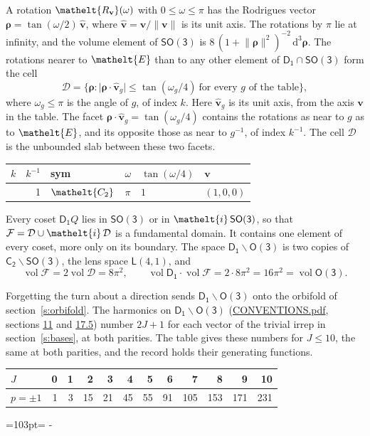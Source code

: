 \documentclass[10pt,a4paper]{article}
\newcommand{\needspace}[1]{\par\penalty-100\begingroup\dimen0=#1\relax\dimen2=\pagegoal
  \advance\dimen2-\pagetotal\ifdim\dimen0>\dimen2\relax\ifdim\dimen2>0pt\vfil\break\fi\fi
  \endgroup}
\numberwithin{equation}{section}
\newcommand{\eltfont}[1]{{\let\sigma\eltsigma\mathelt{#1}}}
\newcommand{\grp}[1]{\mathsf{#1}}
\newcommand{\cls}[1]{\eltfont{#1}}
\newcommand{\elt}[1]{\eltfont{#1}}
\newcommand{\dirvec}[3]{(#1, #2, #3)}
\newcommand{\unitaxis}{\hat{\mathbf{v}}}
\newcommand{\vv}{\mathbf{v}}
\newcommand{\diff}{\mathrm{d}}
\newcommand{\vol}{\operatorname{vol}}
\newcommand{\rodrigues}{\boldsymbol{\rho}}
\newcommand{\fcell}{\mathcal{D}}
\newcommand{\fdomain}{\mathcal{F}}
\newcommand{\lensspace}[2]{\mathsf{L}(#1, #2)}
\begin{document}
\leavevmode\label{n:vector.rodrigues}\label{n:vector.unitaxis}A rotation $\elt{R_{\vv}}(\omega)$ with $0 \le \omega \le \pi$ has the Rodrigues vector $\rodrigues = \tan(\omega/2)\,\unitaxis$, where $\unitaxis = \vv/\lVert\vv\rVert$ is its unit axis. The rotations by $\pi$ lie at infinity, and the volume element of \href{SO3.pdf}{$\grp{SO(3)}$} is $8\,(1 + \lVert\rodrigues\rVert^2)^{-2}\,\diff^3\rodrigues$.
\leavevmode\label{n:set.cell}The rotations nearer to $\elt{E}$ than to any other element of $\grp{D_{1}} \cap \grp{SO(3)}$ form the cell
\begin{equation}\label{e:cell}\fcell = \bigl\{\rodrigues : \lvert\rodrigues\cdot\unitaxis_g\rvert \le \tan(\omega_g/4)\ \text{for every $g$ of the table}\bigr\},\end{equation}
where $\omega_g \le \pi$ is the angle of $g$, of index $k$. Here $\unitaxis_g$ is its unit axis, from the axis $\vv$ in the table. The facet $\rodrigues\cdot\unitaxis_g = \tan(\omega_g/4)$ contains the rotations as near to $g$ as to $\elt{E}$, and its opposite those as near to $g^{-1}$, of index $k^{-1}$. The cell $\fcell$ is the unbounded slab between these two facets.
{\small\begin{longtable}{@{}rrllll@{}}\toprule
$k$ & $k^{-1}$ & sym & $\omega$ & $\tan(\omega/4)$ & $\vv$\\\midrule\endhead
\bottomrule\endfoot\endlastfoot
1 & 1 & $\cls{C_{2}}$ & $\pi$ & $1$ & $\dirvec{1}{0}{0}$\\
\bottomrule\end{longtable}}

\leavevmode\label{n:set.fundamental}Every coset $\grp{D_{1}}Q$ lies in \href{SO3.pdf}{$\grp{SO(3)}$} or in $\elt{i}\,\grp{SO(3)}$, so that $\fdomain = \fcell \cup \elt{i}\,\fcell$ is a fundamental domain. It contains one element of every coset, more only on its boundary.
\leavevmode\label{n:set.lens}The space $\grp{D_{1}}\backslash\grp{O(3)}$ is two copies of $\grp{C_{2}}\backslash\grp{SO(3)}$, the lens space $\lensspace{4}{1}$, and
\begin{equation}\label{e:volume}\vol\fdomain = 2\vol\fcell = 8\pi^2,\qquad \vol\grp{D_{1}}\cdot\vol\fdomain = 2\cdot 8\pi^2 = 16\pi^2 = \vol\grp{O(3)}.\end{equation}

Forgetting the turn about a direction sends $\grp{D_{1}}\backslash\grp{O(3)}$ onto the orbifold of section~\ref{s:orbifold}.
The harmonics on $\grp{D_{1}}\backslash\grp{O(3)}$ (\href{../../CONVENTIONS.pdf}{CONVENTIONS.pdf}, sections \href{../../CONVENTIONS.pdf\#conv.11}{11} and \href{../../CONVENTIONS.pdf\#conv.17.5}{17.5}) number $2J + 1$ for each vector of the trivial irrep in section~\ref{s:bases}, at both parities. The table gives these numbers for $J \le 10$, the same at both parities, and the record holds their generating functions.
{\small\setlength{\tabcolsep}{4pt}\begin{longtable}{@{}lrrrrrrrrrrr@{}}\toprule
$J$ & 0 & 1 & 2 & 3 & 4 & 5 & 6 & 7 & 8 & 9 & 10\\\midrule\endhead
\bottomrule\endfoot\endlastfoot
$p = \pm 1$ & 1 & 3 & 15 & 21 & 45 & 55 & 91 & 105 & 153 & 171 & 231\\
\bottomrule\end{longtable}}
\needspace{103pt}
\end{document}
